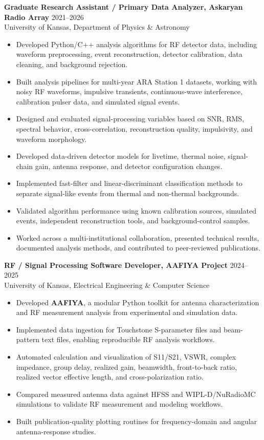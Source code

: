 \documentclass[10pt,letterpaper]{article}
\begin{document}
\textbf{Graduate Research Assistant / Primary Data Analyzer, Askaryan Radio Array} \hfill 2021--2026\\
University of Kansas, Department of Physics \& Astronomy
\begin{itemize}
    \item Developed Python/C++ analysis algorithms for RF detector data, including waveform preprocessing, event reconstruction, detector calibration, data cleaning, and background rejection.
    \item Built analysis pipelines for multi-year ARA Station 1 datasets, working with noisy RF waveforms, impulsive transients, continuous-wave interference, calibration pulser data, and simulated signal events.
    \item Designed and evaluated signal-processing variables based on SNR, RMS, spectral behavior, cross-correlation, reconstruction quality, impulsivity, and waveform morphology.
    \item Developed data-driven detector models for livetime, thermal noise, signal-chain gain, antenna response, and detector configuration changes.
    \item Implemented fast-filter and linear-discriminant classification methods to separate signal-like events from thermal and non-thermal backgrounds.
    \item Validated algorithm performance using known calibration sources, simulated events, independent reconstruction tools, and background-control samples.
    \item Worked across a multi-institutional collaboration, presented technical results, documented analysis methods, and contributed to peer-reviewed publications.
\end{itemize}

\textbf{RF / Signal Processing Software Developer, AAFIYA Project} \hfill 2024--2025\\
University of Kansas, Electrical Engineering \& Computer Science
\begin{itemize}
    \item Developed \textbf{AAFIYA}, a modular Python toolkit for antenna characterization and RF measurement analysis from experimental and simulation data.
    \item Implemented data ingestion for Touchstone S-parameter files and beam-pattern text files, enabling reproducible RF analysis workflows.
    \item Automated calculation and visualization of S11/S21, VSWR, complex impedance, group delay, realized gain, beamwidth, front-to-back ratio, realized vector effective length, and cross-polarization ratio.
    \item Compared measured antenna data against HFSS and WIPL-D/NuRadioMC simulations to validate RF measurement and modeling workflows.
    \item Built publication-quality plotting routines for frequency-domain and angular antenna-response studies.
\end{itemize}
\end{document}
